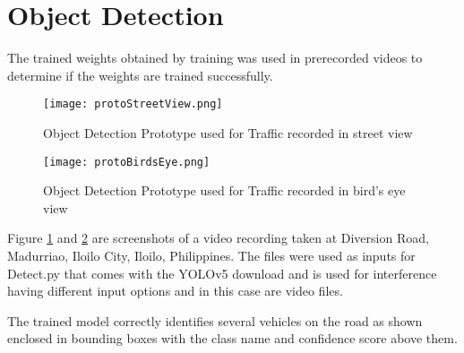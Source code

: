 \section{Object Detection}

The trained weights obtained by training was used in prerecorded videos to determine if the weights are trained successfully.

\begin{figure}[h!]
	\texttt{[image: protoStreetView.png]}
	\caption{Object Detection Prototype used for Traffic recorded in street view}
	\label{fig:protoStreetView}
\end{figure}

\begin{figure}[h!]
	\texttt{[image: protoBirdsEye.png]}
	\caption{Object Detection Prototype used for Traffic recorded in bird's eye view}
	\label{fig:protoBirdsEye}
\end{figure}

Figure \ref{fig:protoStreetView} and \ref{fig:protoBirdsEye} are screenshots of a video recording taken at Diversion Road, Madurriao, Iloilo City, Iloilo, Philippines. The files were used as inputs for Detect.py that comes with the YOLOv5 download and is used for interference having different input options and in this case are video files.

The trained model correctly identifies several vehicles on the road as shown enclosed in bounding boxes with the class name and confidence score above them.


